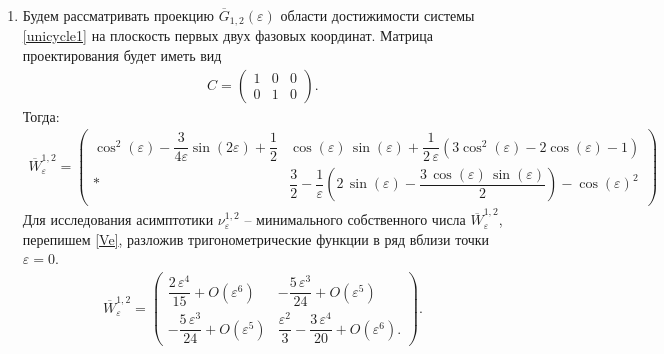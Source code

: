 \documentclass[../main.tex]{subfiles}
\begin{document}
    \begin{enumerate}
        \item Будем рассматривать проекцию $ \overline{G}_{1,2}(\varepsilon) $ области достижимости системы \eqref{unicycle1} на плоскость первых двух фазовых координат. 
Матрица проектирования будет иметь вид
        \begin{gather*}
            C = \begin{pmatrix}
                1 & 0 & 0 \\ 
                0 & 1 & 0 
            \end{pmatrix}. 
        \end{gather*} 
        Тогда: \small
        \begin{gather}\label{Ve}
            \overline{W}_{\varepsilon}^{1,2}= \begin{pmatrix}
                \cos^2(\varepsilon)-\dfrac{3}{4\varepsilon}\sin(2\varepsilon)+\dfrac{1}{2} & 
                \cos\left(\varepsilon \right)\,\sin\left(\varepsilon \right)+\dfrac{1}{2\,\varepsilon}\left( 3\cos^2\left(\varepsilon \right)-2\cos\left(\varepsilon\right)-1\right) \\[6pt]
                * &
                \dfrac{3}{2}-\dfrac{1}{\varepsilon }\left(2\,\sin\left(\varepsilon \right)-\dfrac{3\,\cos\left(\varepsilon \right)\,\sin\left(\varepsilon \right)}{2} \right) -{\cos\left(\varepsilon \right)}^2 
            \end{pmatrix}
        \end{gather}
        \normalsize
        Для исследования асимптотики $ \nu^{1,2}_{\varepsilon} $ -- минимального собственного числа $ \overline{W}_{\varepsilon}^{1,2} $, перепишем \eqref{Ve}, разложив тригонометрические функции в ряд вблизи точки $ \varepsilon = 0 $.
        \begin{gather*}
            \overline{W}_{\varepsilon}^{1,2} = \begin{pmatrix}
                \dfrac{2\,\varepsilon ^4}{15} + O(\varepsilon^6)&
                -\dfrac{5\,\varepsilon ^3}{24} + O(\varepsilon^5)\\[8pt]
                -\dfrac{5\,\varepsilon ^3}{24} + O(\varepsilon^5) & 
                \dfrac{\varepsilon ^2}{3}-\dfrac{3\,\varepsilon ^4}{20} + O(\varepsilon^6).
            \end{pmatrix}.
        \end{gather*}
        

\end{enumerate}
\end{document}
